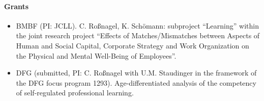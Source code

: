 \enlargethispage{0.5cm}
\begin{bibunit}[apalike]
\nocite{*}
\putbib[profChristianRossnagel]
\end{bibunit}

\paragraph{Grants}

\begin{itemize}
\item BMBF (PI: JCLL). C. Ro\ss nagel, K. Sch\"omann: subproject ``Learning'' within the joint research project ``Effects of Matches/Mismatches between Aspects of Human and Social Capital, Corporate Strategy and Work Organization on the Physical and Mental Well-Being of Employees''. 
\item DFG (submitted, PI: C. Ro\ss nagel with U.M. Staudinger in the framework of the DFG focus program 1293). Age-differentiated analysis of the competency of self-regulated professional learning.
\end{itemize}
